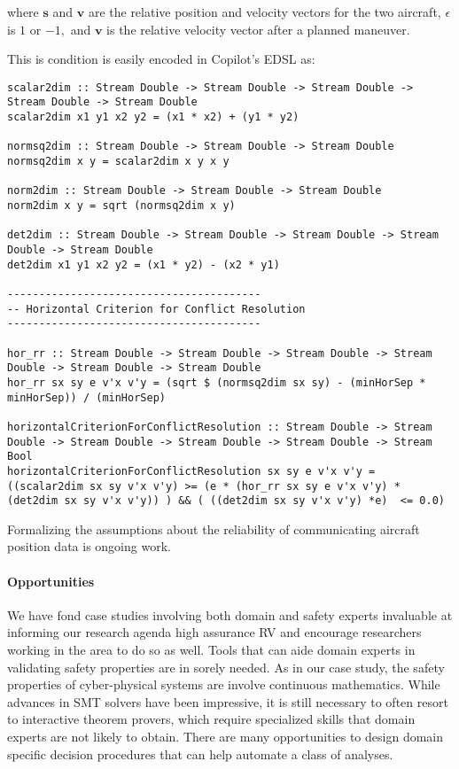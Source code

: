 where $\bm{s}$ and $\bm{v}$ are the  relative position and velocity
vectors for the two aircraft, $\epsilon$ is $1$ or $-1,$  and 
$\bm{v}$ is the relative velocity vector after a planned maneuver. 

This is condition is easily encoded in  Copilot's EDSL as:

\begin{lstlisting}[frame=single]
scalar2dim :: Stream Double -> Stream Double -> Stream Double -> Stream Double -> Stream Double
scalar2dim x1 y1 x2 y2 = (x1 * x2) + (y1 * y2)

normsq2dim :: Stream Double -> Stream Double -> Stream Double
normsq2dim x y = scalar2dim x y x y

norm2dim :: Stream Double -> Stream Double -> Stream Double
norm2dim x y = sqrt (normsq2dim x y)

det2dim :: Stream Double -> Stream Double -> Stream Double -> Stream Double -> Stream Double
det2dim x1 y1 x2 y2 = (x1 * y2) - (x2 * y1)

----------------------------------------
-- Horizontal Criterion for Conflict Resolution
----------------------------------------

hor_rr :: Stream Double -> Stream Double -> Stream Double -> Stream Double -> Stream Double -> Stream Double
hor_rr sx sy e v'x v'y = (sqrt $ (normsq2dim sx sy) - (minHorSep * minHorSep)) / (minHorSep)

horizontalCriterionForConflictResolution :: Stream Double -> Stream Double -> Stream Double -> Stream Double -> Stream Double -> Stream Bool
horizontalCriterionForConflictResolution sx sy e v'x v'y = ((scalar2dim sx sy v'x v'y) >= (e * (hor_rr sx sy e v'x v'y) * (det2dim sx sy v'x v'y)) ) && ( ((det2dim sx sy v'x v'y) *e)  <= 0.0)
\end{lstlisting}

Formalizing the assumptions about the reliability of communicating
aircraft position data is ongoing work. 

\paragraph{Opportunities} We have fond case studies involving both
domain and safety experts invaluable at informing our research agenda
high assurance RV and encourage researchers working in the area to do
so as well.  Tools that can aide domain experts in validating safety
properties are in sorely needed.  As in our case study, the safety
properties of cyber-physical systems are involve continuous
mathematics. While advances in SMT solvers have been impressive, it is
still necessary to often resort to interactive theorem provers, which
require specialized skills that domain experts are not likely to
obtain.  There are many opportunities to design  domain specific decision procedures
that can help automate a class of analyses. 



